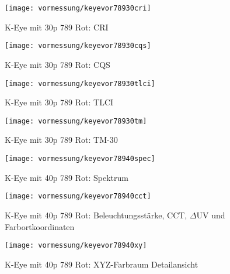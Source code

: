 \documentclass[pagesize,paper=A4,fontsize=12pt,utf8,numbers=noenddot,bibliography=totoc,listof=totoc,DIV=11,BCOR=1mm]{scrreprt}
\begin{document}
\begin{figure}[htp]     %
\centering
\texttt{[image: vormessung/keyevor78930cri]} 
\caption {K-Eye mit 30p 789 Rot: CRI} 
\end{figure}

\begin{figure}[htp]     %
\centering
\texttt{[image: vormessung/keyevor78930cqs]} 
\caption {K-Eye mit 30p 789 Rot: CQS} 
\end{figure}

\begin{figure}[htp]     %
\centering
\texttt{[image: vormessung/keyevor78930tlci]} 
\caption {K-Eye mit 30p 789 Rot: TLCI} 
\end{figure}

\begin{figure}[htp]     %
\centering
\texttt{[image: vormessung/keyevor78930tm]} 
\caption {K-Eye mit 30p 789 Rot: TM-30} 
\end{figure}



\begin{figure}[htp]     %
\centering
\texttt{[image: vormessung/keyevor78940spec]} 
\caption {K-Eye mit 40p 789 Rot: Spektrum} 
\end{figure}

\begin{figure}[htp]     %
\centering
\texttt{[image: vormessung/keyevor78940cct]} 
\caption {K-Eye mit 40p 789 Rot: Beleuchtungsstärke, CCT, $\Delta$UV und Farbortkoordinaten} 
\end{figure}

\begin{figure}[htp]     %
\centering
\texttt{[image: vormessung/keyevor78940xy]} 
\caption {K-Eye mit 40p 789 Rot: XYZ-Farbraum Detailansicht} 
\end{figure}
\end{document}
